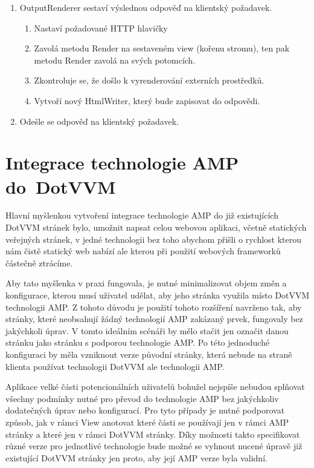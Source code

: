 \begin{enumerate}
    \item OutputRenderer sestaví výslednou odpověď na klientský požadavek.
    \begin{enumerate}
        \item Nastaví požadované HTTP hlavičky
        \item Zavolá metodu Render na sestaveném view (kořenu stromu), ten pak metodu Render zavolá na svých potomcích.
        \item Zkontroluje se, že došlo k vyrenderování externích prostředků.
        \item Vytvoří nový HtmlWriter, který bude zapisovat do odpovědi.
    \end{enumerate}
    \item Odešle se odpověď na klientský požadavek.
\end{enumerate}

\chapter{Integrace technologie AMP do~DotVVM}
Hlavní myšlenkou vytvoření integrace technologie AMP do již existujících DotVVM stránek bylo,  umožnit napsat celou webovou aplikaci, včetně statických veřejných stránek, v jedné technologii bez toho abychom přišli o rychlost kterou nám čistě statický web nabízí ale kterou při použití webových frameworků částečně ztrácíme.

Aby tato myšlenka v praxi fungovala, je nutné minimalizovat objem změn a konfigurace, kterou musí uživatel udělat, aby jeho stránka využila místo DotVVM technologii AMP. Z tohoto důvodu je použití tohoto rozšíření navrženo tak, aby stránky, které neobsahují žádný technologií AMP zakázaný prvek, fungovaly bez jakýchkoli úprav. V tomto ideálním scénáři by mělo stačit jen označit danou stránku jako stránku s podporou technologie AMP. Po této jednoduché konfiguraci by měla vzniknout verze původní stránky, která nebude na straně klienta používat technologii DotVVM ale technologii AMP.

Aplikace velké části potencionálních uživatelů bohužel nejspíše nebudou splňovat všechny podmínky nutné pro převod do technologie AMP bez jakýchkoliv dodatečných úprav nebo konfigurací. Pro tyto případy je nutné podporovat způsob, jak v rámci View anotovat které části se používají jen v rámci AMP stránky a které jen v rámci DotVVM stránky. Díky možnosti takto specifikovat různé verze pro jednotlivé technologie bude možné se vyhnout nucené úpravě již existující DotVVM stránky jen proto, aby její AMP verze byla validní.

